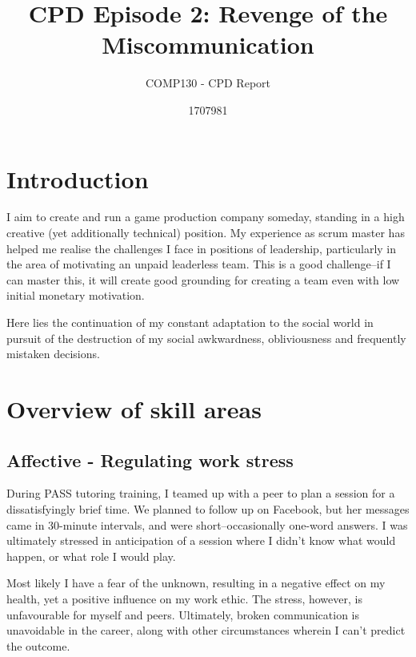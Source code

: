 \documentclass{scrartcl}
\title{CPD Episode 2: Revenge of the Miscommunication}
\subtitle{COMP130 - CPD Report}
\author{1707981}
\begin{document}
\maketitle

\section{Introduction} %
I aim to create and run a game production company someday, standing in a high creative (yet additionally technical) position. My experience as scrum master has helped me realise the challenges I face in positions of leadership, particularly in the area of motivating an unpaid leaderless team. This is a good challenge--if I can master this, it will create good grounding for creating a team even with low initial monetary motivation.

Here lies the continuation of my constant adaptation to the social world in pursuit of the destruction of my social awkwardness, obliviousness and frequently mistaken decisions.



\section{Overview of skill areas}
\subsection{Affective - Regulating work stress} %
During PASS tutoring training, I teamed up with a peer to plan a session for a dissatisfyingly brief time. We planned to follow up on Facebook, but her messages came in 30-minute intervals, and were short--occasionally one-word answers. I was ultimately stressed in anticipation of a session where I didn't know what would happen, or what role I would play.

Most likely I have a fear of the unknown, resulting in a negative effect on my health, yet a positive influence on my work ethic. The stress, however, is unfavourable for myself and peers. Ultimately, broken communication is unavoidable in the career, along with other circumstances wherein I can't predict the outcome.
\end{document}
